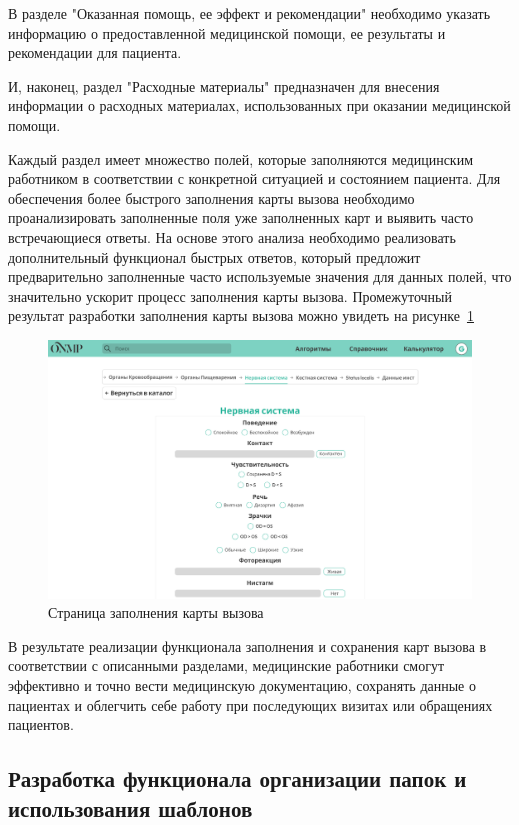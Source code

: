 В разделе "Оказанная помощь, ее эффект и рекомендации" необходимо указать информацию о предоставленной медицинской помощи, ее результаты и рекомендации для пациента.

И, наконец, раздел "Расходные материалы" предназначен для внесения информации о расходных материалах, использованных при оказании медицинской помощи.

Каждый раздел имеет множество полей, которые заполняются медицинским работником в соответствии с конкретной ситуацией и состоянием пациента. Для обеспечения более быстрого заполнения карты вызова необходимо проанализировать заполненные поля уже заполненных карт и выявить часто встречающиеся ответы. На основе этого анализа необходимо реализовать дополнительный функционал быстрых ответов, который предложит предварительно заполненные часто используемые значения для данных полей, что значительно ускорит процесс заполнения карты вызова. Промежуточный результат разработки заполнения карты вызова можно увидеть на рисунке~\ref{fig:result1}

\begin{figure}
  \includegraphics[scale=0.58]{styles/diploma/inc/result1.png}
  \caption{Страница заполнения карты вызова}
  \label{fig:result1}
\end{figure}

В результате реализации функционала заполнения и сохранения карт вызова в соответствии с описанными разделами, медицинские работники смогут эффективно и точно вести медицинскую документацию, сохранять данные о пациентах и облегчить себе работу при последующих визитах или обращениях пациентов.

\subsection{Разработка функционала организации папок и использования шаблонов}

